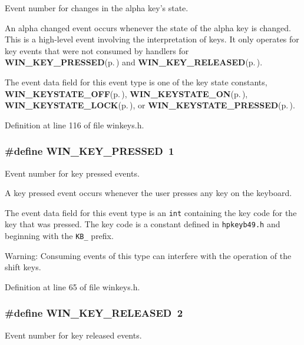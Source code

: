 Event number for changes in the alpha key's state. 

An alpha changed event occurs whenever the state of the alpha key is changed. This is a high-level event involving the interpretation of keys. It only operates for key events that were not consumed by handlers for {\bf WIN\_\-KEY\_\-PRESSED}{\rm (p.\,\pageref{winkeys_8h_a0})} and {\bf WIN\_\-KEY\_\-RELEASED}{\rm (p.\,\pageref{winkeys_8h_a1})}.

The event data field for this event type is one of the key state constants, {\bf WIN\_\-KEYSTATE\_\-OFF}{\rm (p.\,\pageref{winkeys_8h_a6})}, {\bf WIN\_\-KEYSTATE\_\-ON}{\rm (p.\,\pageref{winkeys_8h_a7})}, {\bf WIN\_\-KEYSTATE\_\-LOCK}{\rm (p.\,\pageref{winkeys_8h_a8})}, or {\bf WIN\_\-KEYSTATE\_\-PRESSED}{\rm (p.\,\pageref{winkeys_8h_a9})}. 

Definition at line 116 of file winkeys.h.
\subsubsection{\setlength{\rightskip}{0pt plus 5cm}\#define WIN\_\-KEY\_\-PRESSED~1}\label{winkeys_8h_a0}


Event number for key pressed events. 

A key pressed event occurs whenever the user presses any key on the keyboard.

The event data field for this event type is an {\tt int} containing the key code for the key that was pressed. The key code is a constant defined in {\tt hpkeyb49.h} and beginning with the {\tt KB\_\-} prefix.

\begin{Desc}
\item[Warning:]Consuming events of this type can interfere with the operation of the shift keys. \end{Desc}


Definition at line 65 of file winkeys.h.
\subsubsection{\setlength{\rightskip}{0pt plus 5cm}\#define WIN\_\-KEY\_\-RELEASED~2}\label{winkeys_8h_a1}


Event number for key released events. 

